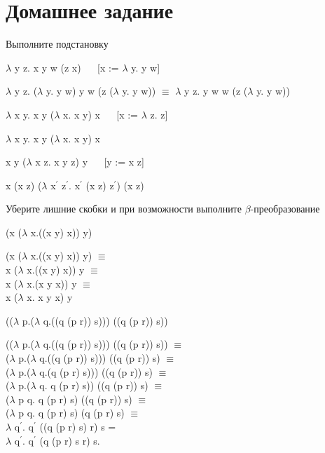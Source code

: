 \documentclass[a4paper,12pt]{article} %
\begin{document}
\section{Домашнее задание}

\begin{enumerate}
{\item Выполните подстановку}

\begin{enumerate}
{\item $\lambda$ y z. x y w (z x) $\quad$ [x := $\lambda$ y. y w]}

$\lambda$ y z. ($\lambda$ y. y w) y w (z ($\lambda$ y. y w)) $\equiv$ $\lambda$ y z. y w w (z ($\lambda$ y. y w))

{\item $\lambda$ x y. x y ($\lambda$ x. x y) x $\quad$ [x := $\lambda$ z. z]}

$\lambda$ x y. x y ($\lambda$ x. x y) x

{\item x y ($\lambda$ x z. x y z) y $\quad$ [y := x z]}

x (x z) ($\lambda$ x$^\prime$ z$^\prime$. x$^\prime$ (x z) z$^\prime$) (x z)

\end{enumerate}

{\item Уберите лишние скобки и при возможности выполните $\beta$-преобразование}

\begin{enumerate}

{\item (x ($\lambda$ x.((x y) x)) y)}

{\color{red}(}x ($\lambda$ x.((x y) x)) y{\color{red})} $\equiv$ \\
x ($\lambda$ x.({\color{red}(}x y{\color{red})} x)) y $\equiv$ \\
x ($\lambda$ x.{\color{red}(}x y x{\color{red})}) y $\equiv$ \\
x ($\lambda$ x. x y x) y

{\item (($\lambda$ p.($\lambda$ q.((q (p r)) s))) ((q (p r)) s))}

{\color{red}(}($\lambda$ p.($\lambda$ q.((q (p r)) s))) ((q (p r)) s){\color{red})} $\equiv$ \\
($\lambda$ p.($\lambda$ q.({\color{red}(}q (p r){\color{red})} s))) ((q (p r)) s) $\equiv$ \\
($\lambda$ p.($\lambda$ q.{\color{red}(}q (p r) s{\color{red})})) ((q (p r)) s) $\equiv$ \\
($\lambda$ p.{\color{red}(}$\lambda$ q. q (p r) s{\color{red})}) ((q (p r)) s) $\equiv$ \\
($\lambda$ p q. q (p r) s) ({\color{red}(}q (p r){\color{red})} s) $\equiv$ \\
($\lambda$ p q. q (p r) s) (q (p r) s) $\equiv$ \\
$\lambda$ q$^\prime$. q$^\prime$ ({\color{red}(}q (p r) s{\color{red})} r) s = \\
$\lambda$ q$^\prime$. q$^\prime$ (q (p r) s r) s.


\end{enumerate}
\end{enumerate}
\end{document}
